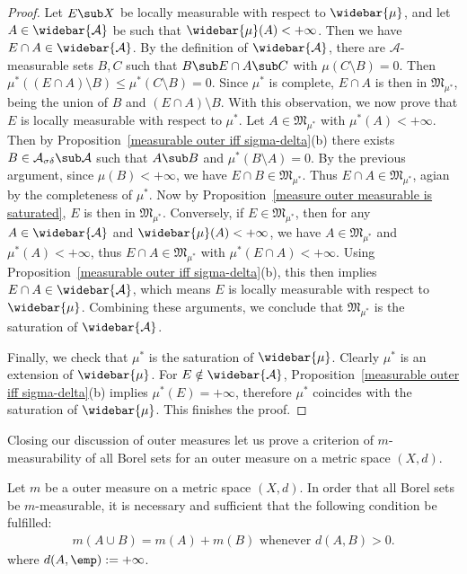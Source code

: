 \begin{proof}
Let $E\sub X$ be locally measurable with respect to $\widebar{\mu}$, and let $A\in\widebar{\mathcal{A}}$ be such that $\widebar{\mu}(A)<+\infty$. Then we have $E\cap A\in\widebar{\mathcal{A}}$. By the definition of $\widebar{\mathcal{A}}$, there are $\mathcal{A}$-measurable sets $B,C$ such that $B\sub E\cap A\sub C$ with $\mu(C\setminus B)=0$. Then $\mu^*((E\cap A)\setminus B)\leq\mu^*(C\setminus B)=0$. Since $\mu^*$ is complete, $E\cap A$ is then in $\mathfrak{M}_{\mu^*}$, being the union of $B$ and $(E\cap A)\setminus B$. With this observation, we now prove that $E$ is locally measurable with respect to $\mu^*$. Let $A\in\mathfrak{M}_{\mu^*}$ with $\mu^*(A)<+\infty$. Then by Proposition~\ref{measurable outer iff sigma-delta}(b) there exists $B\in\mathcal{A}_{\sigma\delta}\sub\mathcal{A}$ such that $A\sub B$ and $\mu^*(B\setminus A)=0$. By the previous argument, since $\mu(B)<+\infty$, we have $E\cap B\in\mathfrak{M}_{\mu^*}$. Thus $E\cap A\in\mathfrak{M}_{\mu^*}$, agian by the completeness of $\mu^*$. Now by Proposition~\ref{measure outer measurable is saturated}, $E$ is then in $\mathfrak{M}_{\mu^*}$. Conversely, if $E\in\mathfrak{M}_{\mu^*}$, then for any $A\in\widebar{\mathcal{A}}$ and $\widebar{\mu}(A)<+\infty$, we have $A\in\mathfrak{M}_{\mu^*}$ and $\mu^*(A)<+\infty$, thus $E\cap A\in\mathfrak{M}_{\mu^*}$ with $\mu^*(E\cap A)<+\infty$. Using Proposition~\ref{measurable outer iff sigma-delta}(b), this then implies $E\cap A\in\widebar{\mathcal{A}}$, which means $E$ is locally measurable with respect to $\widebar{\mu}$. Combining these arguments, we conclude that $\mathfrak{M}_{\mu^*}$ is the saturation of $\widebar{\mathcal{A}}$.\par
Finally, we check that $\mu^*$ is the saturation of $\widebar{\mu}$. Clearly $\mu^*$ is an extension of $\widebar{\mu}$. For $E\notin\widebar{\mathcal{A}}$, Proposition~\ref{measurable outer iff sigma-delta}(b) implies $\mu^*(E)=+\infty$, therefore $\mu^*$ coincides with the saturation of $\widebar{\mu}$. This finishes the proof.
\end{proof}
Closing our discussion of outer measures let us prove a criterion of $m$-measurability of all Borel sets for an outer measure on a metric space $(X,d)$.
\begin{theorem}\label{measure metric measurable iff}
Let $m$ be a outer measure on a metric space $(X,d)$. In order that all Borel sets be $m$-measurable, it is necessary and sufficient that the following condition be fulfilled:
\begin{align}\label{outer measure borel set measurable iff-1}
m(A\cup B)=m(A)+m(B)\text{ whenever }d(A,B)>0.
\end{align}
where $d(A,\emp):=+\infty$.
\end{theorem}
